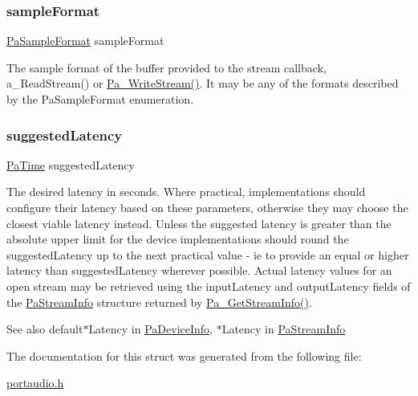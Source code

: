 \subsubsection{\texorpdfstring{sample\+Format}{sampleFormat}}
{\footnotesize\ttfamily \hyperlink{portaudio_8h_a4582d93c2c2e60e12be3d74c5fe00b96}{Pa\+Sample\+Format} sample\+Format}

The sample format of the buffer provided to the stream callback, a\+\_\+\+Read\+Stream() or \hyperlink{portaudio_8h_a075a6efb503a728213bdae24347ed27d}{Pa\+\_\+\+Write\+Stream()}. It may be any of the formats described by the Pa\+Sample\+Format enumeration. \mbox{\label{struct_pa_stream_parameters_aff6312de977fdaa040088963cdd92236}} 
\subsubsection{\texorpdfstring{suggested\+Latency}{suggestedLatency}}
{\footnotesize\ttfamily \hyperlink{portaudio_8h_af17a7e6d0471a23071acf8dbd7bbe4bd}{Pa\+Time} suggested\+Latency}

The desired latency in seconds. Where practical, implementations should configure their latency based on these parameters, otherwise they may choose the closest viable latency instead. Unless the suggested latency is greater than the absolute upper limit for the device implementations should round the suggested\+Latency up to the next practical value -\/ ie to provide an equal or higher latency than suggested\+Latency wherever possible. Actual latency values for an open stream may be retrieved using the input\+Latency and output\+Latency fields of the \hyperlink{struct_pa_stream_info}{Pa\+Stream\+Info} structure returned by \hyperlink{portaudio_8h_a3d9c4cbda4e9f381b76f287c3de8a758}{Pa\+\_\+\+Get\+Stream\+Info()}. \begin{DoxySeeAlso}{See also}
default$\ast$\+Latency in \hyperlink{struct_pa_device_info}{Pa\+Device\+Info}, $\ast$\+Latency in \hyperlink{struct_pa_stream_info}{Pa\+Stream\+Info} 
\end{DoxySeeAlso}


The documentation for this struct was generated from the following file\+:\begin{DoxyCompactItemize}
\item 
\hyperlink{portaudio_8h}{portaudio.\+h}\end{DoxyCompactItemize}
